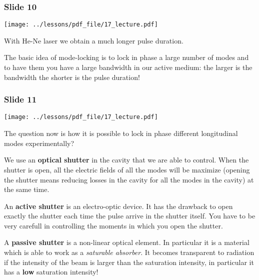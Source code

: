 \documentclass[../main/main.tex]{subfiles}
\begin{document}
\subsubsection*{Slide 10}

\begin{minipage}[]{0.5\linewidth}
\centering
\texttt{[image: ../lessons/pdf\_file/17\_lecture.pdf]}
\end{minipage}
\hspace{0.3cm}\vspace{0.3cm}
\begin{minipage}[c]{0.47\linewidth}

With He-Ne laser we obtain a much longer pulse duration.

The basic idea of mode-locking is to lock in phase a large number of modes and to have them you have a large bandwidth in our active medium: the larger is the bandwidth the shorter is the pulse duration!

\end{minipage}

\subsubsection*{Slide 11}

\begin{minipage}[]{0.5\linewidth}
\centering
\texttt{[image: ../lessons/pdf\_file/17\_lecture.pdf]}
\end{minipage}
\hspace{0.3cm}\vspace{0.3cm}
\begin{minipage}[c]{0.47\linewidth}

The question now is how it is possible to lock in phase different longitudinal modes experimentally?

We use an \textbf{optical shutter} in the cavity that we are able to control. When the shutter is open, all the electric fields of all the modes will be maximize (opening the shutter means reducing losses in the cavity for all the modes in the cavity) at the same time.

An \textbf{active shutter} is an electro-optic device. It has the drawback to open exactly the shutter each time the pulse arrive in the shutter itself. You have to be very carefull in controlling the moments in which you open the shutter.

A \textbf{passive shutter} is a non-linear optical element. In particular it is a material which is able to work as a \emph{saturable absorber}. It becomes transparent to radiation if the intensity of the beam is larger than the saturation intensity, in particular it has a \textbf{low} saturation intensity!

\end{minipage}
\end{document}
